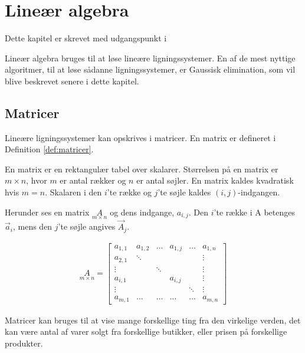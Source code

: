 \chapter{Lineær algebra}
Dette kapitel er skrevet med udgangspunkt i \citep{lial}

Lineær algebra bruges til at løse lineære ligningssystemer. 
En af de mest nyttige algoritmer, til at løse sådanne ligningssystemer, er Gaussisk elimination, som vil blive beskrevet senere i dette kapitel.

\section{Matricer}
Lineære ligningssystemer kan opskrives i matricer. 
En matrix er defineret i Definition \ref{def:matricer}.

\begin{defn} [Matrix]
En matrix er en rektangulær tabel over skalarer. 
Størrelsen på en matrix er $m \times n$, hvor $m$ er antal rækker og $n$ er antal søjler. 
En matrix kaldes kvadratisk hvis $m=n$. 
Skalaren i den $i$'te række og $j$'te søjle kaldes $(i,j)$-indgangen.
\label{def:matricer}
\end{defn}

Herunder ses en matrix $\underset{m \times n}{A}$ og dens indgange, $a_{i,j}$. Den $i$'te række i A betenges $\vec{a}_i$, mens den $j$'te søjle angives $\vec{A}_j$.

\begin{align*}
\underset{m \times n}{A} = \begin{bmatrix}
	a_{1,1} & a_{1,2} & \dots & a_{1,j} & \dots & a_{1,n} \\
	a_{2,1} & \ddots  &       &         &       & \vdots \\
	\vdots  &         & \ddots &        &       & \vdots \\
	a_{i,1} &         &       & a_{i,j} &       & \vdots \\
	\vdots  &         &       &         & \ddots& \vdots \\
	a_{m,1} & \dots   & \dots & \dots   & \dots & a_{m,n} 
\end{bmatrix}
\end{align*}

Matricer kan bruges til at vise mange forskellige ting fra den virkelige verden, det kan være antal af varer solgt fra forskellige butikker, eller prisen på forskellige produkter. 

